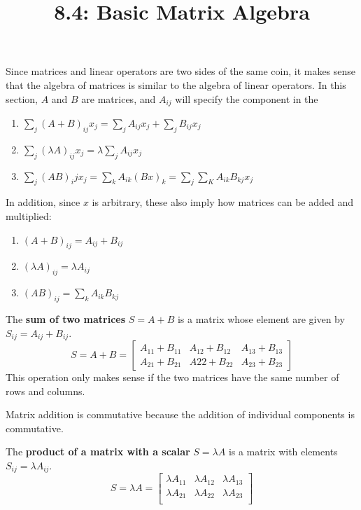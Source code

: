 \documentclass{article}
\title{8.4: Basic Matrix Algebra}
\begin{document}
\maketitle
Since matrices and linear operators are two sides of the same coin, it makes sense that the algebra of matrices is similar to the algebra of linear operators. In this section, $A$ and $B$ are matrices, and $A_{ij}$ will specify the component in the 

\begin{enumerate}
    \item $\sum_{j}(A+B)_{ij}x_j = \sum_{j}A_{ij} x_j + \sum_{j} B_{ij}x_j$
    \item $\sum_j(\lambda A)_{ij}x_j = \lambda\sum_j A_{ij}x_j$
    \item $\sum_j(AB)_ij x_j = \sum_k A_{ik} (Bx)_k = \sum_j \sum_K A_{ik}B_{kj}x_j$
\end{enumerate}

In addition, since $x$ is arbitrary, these also imply how matrices can be added and multiplied:

\begin{enumerate}
    \item $(A+B)_{ij} = A_{ij} + B_{ij}$
    \item $(\lambda A)_{ij} = \lambda A_{ij}$
    \item $(AB)_{ij} = \sum_{k}A_{ik}B_{kj}$
\end{enumerate}

\begin{definition}
The \textbf{sum of two matrices} $S = A + B$ is a matrix whose element are given by $S_{ij} = A_{ij} + B_{ij}$. $$S = A+B = \begin{bmatrix}
    A_{11} + B_{11} & A_{12} + B_{12} & A_{13} + B_{13}\\
    A_{21} + B_{21} & A{22} + B_{22} & A_{23} + B_{23}
\end{bmatrix}$$This operation only makes sense if the two matrices have the same number of rows and columns.
\end{definition}

Matrix addition is commutative because the addition of individual components is commutative. 

\begin{definition}
The \textbf{product of a matrix with a scalar} $S = \lambda A$ is a matrix with elements $S_{ij} = \lambda A_{ij}$.$$S = \lambda A = \begin{bmatrix} 
    \lambda A_{11} & \lambda A_{12} & \lambda A_{13} \\
    \lambda A_{21} & \lambda A_{22} & \lambda A_{23} \\
\end{bmatrix}$$
\end{definition}
\end{document}
